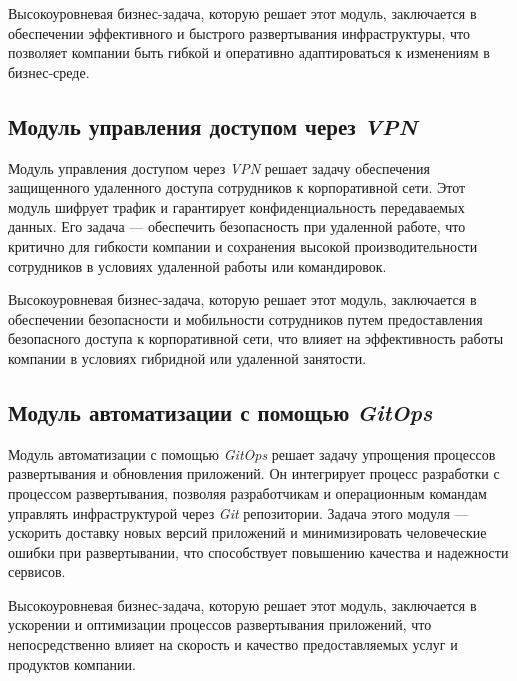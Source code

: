 Высокоуровневая бизнес-задача, которую решает этот модуль, заключается в обеспечении эффективного и быстрого развертывания инфраструктуры, что позволяет компании быть гибкой и оперативно адаптироваться к изменениям в бизнес-среде.

\subsection{Модуль управления доступом через \textit{VPN}} 
\label{sec:vpn_access_module}

Модуль управления доступом через \textit{VPN} решает задачу обеспечения защищенного удаленного доступа сотрудников к корпоративной сети. Этот модуль шифрует трафик и гарантирует конфиденциальность передаваемых данных. Его задача — обеспечить безопасность при удаленной работе, что критично для гибкости компании и сохранения высокой производительности сотрудников в условиях удаленной работы или командировок.

Высокоуровневая бизнес-задача, которую решает этот модуль, заключается в обеспечении безопасности и мобильности сотрудников путем предоставления безопасного доступа к корпоративной сети, что влияет на эффективность работы компании в условиях гибридной или удаленной занятости.

\subsection{Модуль автоматизации с помощью \textit{GitOps}} 
\label{sec:gitops_automation_module}

Модуль автоматизации с помощью \textit{GitOps} решает задачу упрощения процессов развертывания и обновления приложений. Он интегрирует процесс разработки с процессом развертывания, позволяя разработчикам и операционным командам управлять инфраструктурой через 
\textit{Git} репозитории. Задача этого модуля — ускорить доставку новых версий приложений и минимизировать человеческие ошибки при развертывании, что способствует повышению качества и надежности сервисов.

Высокоуровневая бизнес-задача, которую решает этот модуль, заключается в ускорении и оптимизации процессов развертывания приложений, что непосредственно влияет на скорость и качество предоставляемых услуг и продуктов компании.
